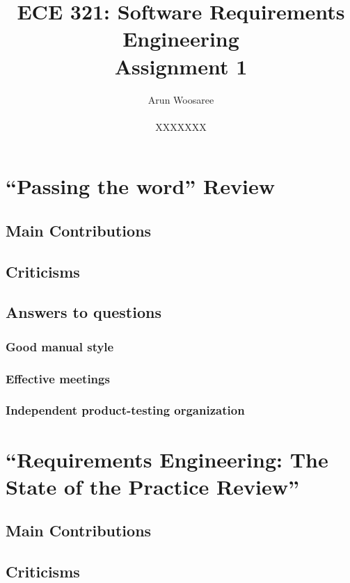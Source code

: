 \documentclass[letterpaper,12pt]{article}
\title{ECE 321: Software Requirements Engineering \\ Assignment 1}
\author{Arun Woosaree \\ \\ XXXXXXX}
\begin{document}
  \maketitle

\section{``Passing the word'' Review}

\subsection{Main Contributions}
  \lipsum[1]

\subsection{Criticisms}
  \lipsum[2]

\subsection{Answers to questions}
  \subsubsection{Good manual style}
    \lipsum[66]
  \subsubsection{Effective meetings}
    \lipsum[66]
  \subsubsection{Independent product-testing organization}
    \lipsum[66]

  \section{``Requirements Engineering: The State of the Practice Review''}

  \subsection{Main Contributions}
    \lipsum[3]

  \subsection{Criticisms}
    \lipsum[4]
\end{document}

